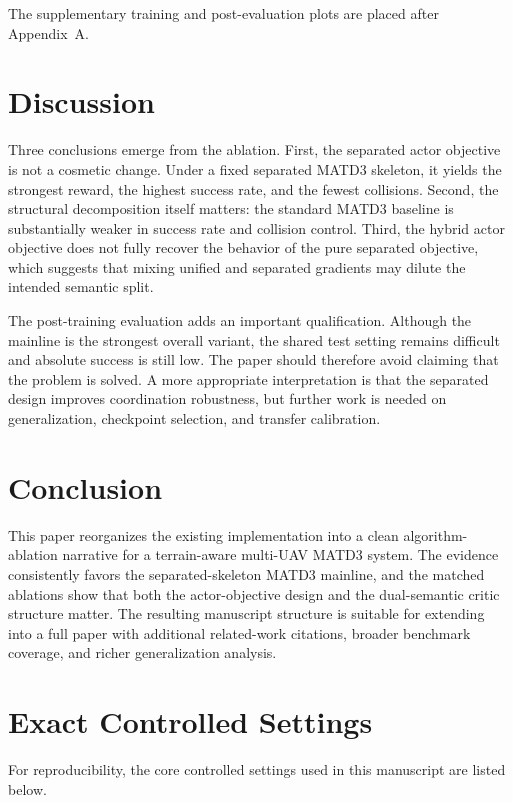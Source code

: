 \documentclass[a4paper,fleqn]{cas-dc}
\begin{document}
The supplementary training and post-evaluation plots are placed after Appendix~A.

\section{Discussion}

Three conclusions emerge from the ablation. First, the separated actor objective is not a cosmetic change. Under a fixed separated MATD3 skeleton, it yields the strongest reward, the highest success rate, and the fewest collisions. Second, the structural decomposition itself matters: the standard MATD3 baseline is substantially weaker in success rate and collision control. Third, the hybrid actor objective does not fully recover the behavior of the pure separated objective, which suggests that mixing unified and separated gradients may dilute the intended semantic split.

The post-training evaluation adds an important qualification. Although the mainline is the strongest overall variant, the shared test setting remains difficult and absolute success is still low. The paper should therefore avoid claiming that the problem is solved. A more appropriate interpretation is that the separated design improves coordination robustness, but further work is needed on generalization, checkpoint selection, and transfer calibration.

\section{Conclusion}

This paper reorganizes the existing implementation into a clean algorithm-ablation narrative for a terrain-aware multi-UAV MATD3 system. The evidence consistently favors the separated-skeleton MATD3 mainline, and the matched ablations show that both the actor-objective design and the dual-semantic critic structure matter. The resulting manuscript structure is suitable for extending into a full paper with additional related-work citations, broader benchmark coverage, and richer generalization analysis.

\appendix
\section{Exact Controlled Settings}

For reproducibility, the core controlled settings used in this manuscript are listed below.
\end{document}

